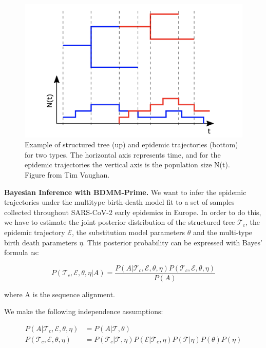 \begin{figure}[h]
    \centering
    \includegraphics[width=\textwidth]{figures/epitrajs.png}
    \caption{Example of structured tree (up) and epidemic trajectories (bottom) for two types. The horizontal axis represents time, and for the epidemic trajectories the vertical axis is the population size N(t). Figure from Tim Vaughan. }
    \label{fig:epitrajs}
\end{figure}

\textbf{Bayesian Inference with BDMM-Prime.} 
We want to infer the epidemic trajectories under the multitype birth-death model fit to a set of samples collected throughout SARS-CoV-2 early epidemics in Europe. In order to do this, we have to estimate the joint posterior distribution of the structured tree $\mathcal{T}_c$, the epidemic trajectory $\mathcal{E}$, the substitution model parameters $\theta$ and the multi-type birth death parameters $\eta$. This posterior probability can be expressed with Bayes' formula as:

\begin{equation}
P(\mathcal{T}_c, \mathcal{E}, \theta, \eta | A ) = \frac{P(A | \mathcal{T}_c, \mathcal{E}, \theta, \eta ) P(\mathcal{T}_c, \mathcal{E}, \theta, \eta)}{P(A)}
\label{eq:posterior1}
\end{equation}

where A is the sequence alignment.

We make the following independence assumptions:

\begin{align}
P(A | \mathcal{T}_c, \mathcal{E}, \theta, \eta ) &= P(A | \mathcal{T},\theta )\\
P(\mathcal{T}_c, \mathcal{E}, \theta, \eta) &= P(\mathcal{T}_c|\mathcal{T}, \eta) P(\mathcal{E}|\mathcal{T}_c, \eta) P(\mathcal{T} | \eta ) P(\theta) P(\eta)
\label{eq:assumptions}
\end{align}


